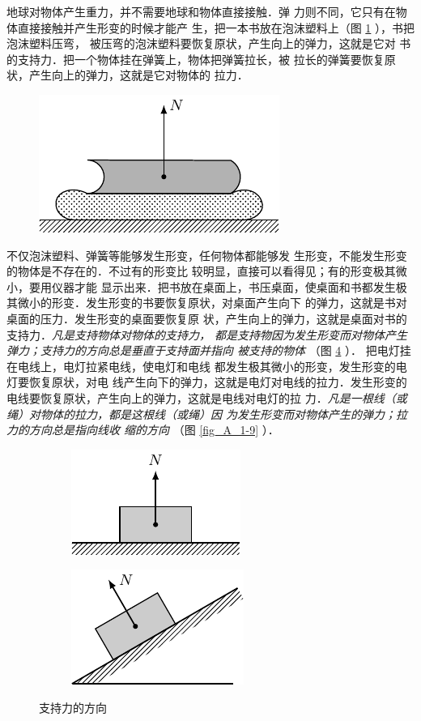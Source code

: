     地球对物体产生重力，并不需要地球和物体直接接触．弹
力则不同，它只有在物体直接接触并产生形变的时候才能产
生，把一本书放在泡沫塑料上（图 \ref{fig_A_1-7} ），书把泡沫塑料压弯，
被压弯的泡沫塑料要恢复原状，产生向上的弹力，这就是它对
书的支持力．把一个物体挂在弹簧上，物体把弹簧拉长，被
拉长的弹簧要恢复原状，产生向上的弹力，这就是它对物体的
拉力．
\begin{figure} [htp]
\centering
\includegraphics{fig/A/1-7.pdf} 
\caption{} \label{fig_A_1-7} 
\end{figure} 

    不仅泡沫塑料、弹簧等能够发生形变，任何物体都能够发
生形变，不能发生形变的物体是不存在的．不过有的形变比
较明显，直接可以看得见；有的形变极其微小，要用仪器才能
显示出来．把书放在桌面上，书压桌面，使桌面和书都发生极
其微小的形变．发生形变的书要恢复原状，对桌面产生向下
的弹力，这就是书对桌面的压力．发生形变的桌面要恢复原
状，产生向上的弹力，这就是桌面对书的支持力．\textit{凡是支持物体对物体的支持力，
都是支持物因为发生形变而对物体产生弹力；支持力的方向总是垂直于支持面并指向
被支持的物体} （图 \ref{fig_A_1-8} ）．
把电灯挂在电线上，电灯拉紧电线，使电灯和电线
都发生极其微小的形变，发生形变的电灯要恢复原状，对电
线产生向下的弹力，这就是电灯对电线的拉力．发生形变的
电线要恢复原状，产生向上的弹力，这就是电线对电灯的拉
力．\textit{凡是一根线（或绳）对物体的拉力，都是这根线（或绳）因
为发生形变而对物体产生的弹力；拉力的方向总是指向线收
缩的方向} （图 \ref{fig_A_1-9} ）．

\begin{figure} [htp]\centering
	\begin{subfigure} {0.46\linewidth} 
		\centering
		\includegraphics{fig/A/1-8a.pdf} 
		\caption{} \label{fig_A_1-8a} 
	\end{subfigure} 
	\hfil
\begin{subfigure} {0.46\linewidth} 
	\centering
	\includegraphics{fig/A/1-8b.pdf} 
	\caption{} \label{fig_A_1-8b} 
\end{subfigure} 
\caption{支持力的方向} \label{fig_A_1-8} 
\end{figure} 


